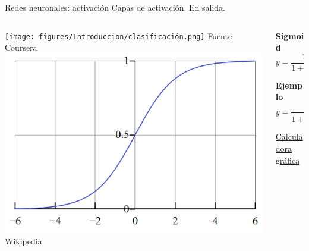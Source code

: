 \begin{frame}{Redes neuronales: activación}
Capas de activación. En salida.
\newline

\begin{columns}[c]
\centering
\begin{column}{0.4\textwidth}
    \centering
    \texttt{[image: figures/Introduccion/clasificación.png]}
    \scriptsize{Fuente Coursera}
    \includegraphics[width=\textwidth]{figures/Introduccion/sigmoid_graph.png}
    \scriptsize{Wikipedia}
\end{column}
\begin{column}{0.4\textwidth}
    \centering

    \textbf{Sigmoid}
    \begin{equation}
     y = \frac{1}{1 + e^{-z}}
    \end{equation}
    
    \vspace{0.5cm}
    
    \textbf{Ejemplo}
    \begin{equation}
     y = \frac{1}{1 + e^{-(3*x-2)}}
    \end{equation}

    \vspace{0.5cm}
    
    \href{https://www.desmos.com/calculator/ctrsgcjd8n}{Calculadora gráfica}
\end{column}
\end{columns}

\end{frame}

